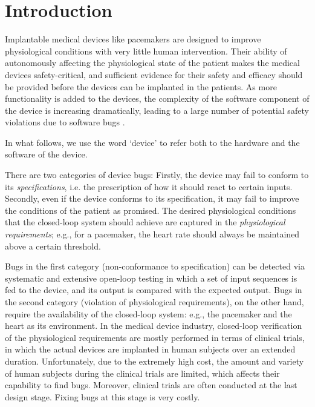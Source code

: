 \section{Introduction}
\label{introduction}

Implantable medical devices like pacemakers are designed to improve physiological conditions with very little human intervention. 
Their ability of autonomously affecting the physiological state of the patient makes the medical devices safety-critical, and sufficient evidence for their safety and efficacy should be provided before the devices can be implanted in the patients. 
As more functionality is added to the devices, the complexity of the software component of the device is increasing dramatically, leading to a large number of potential safety violations due to software bugs \cite{recall_stats}.

In what follows, we use the word `device' to refer both to the hardware and the software of the device.

There are two categories of device bugs: 
Firstly, the device may fail to conform to its \emph{specifications}, i.e. the prescription of how it should react to certain inputs.  
Secondly, even if the device conforms to its specification, it may fail to improve the conditions of the patient as promised. 
The desired physiological conditions that the closed-loop system should achieve are captured in the \emph{physiological requirements}; e.g., for a pacemaker, the heart rate should always be maintained above a certain threshold. 

Bugs in the first category (non-conformance to specification) can be detected via systematic and extensive open-loop testing in which a set of input sequences is fed to the device, and its output is compared with the expected output.
Bugs in the second category (violation of physiological requirements), on the other hand, require the availability of the closed-loop system: e.g., the pacemaker and the heart as its environment. 
In the medical device industry, closed-loop verification of the physiological requirements are mostly performed in terms of clinical trials, in which the actual devices are implanted in human subjects over an extended duration.
Unfortunately, due to the extremely high cost, the amount and variety of human subjects during the clinical trials are limited, which affects their capability to find bugs. 
Moreover, clinical trials are often conducted at the last design stage. Fixing bugs at this stage is very costly.

